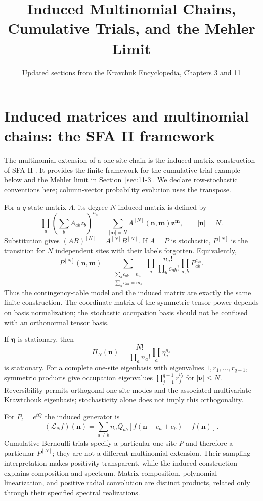 \documentclass[11pt,reqno]{amsart}
\title{Induced Multinomial Chains, Cumulative Trials, and the Mehler Limit}
\date{Updated sections from the Kravchuk Encyclopedia, Chapters 3 and 11}
\begin{document}
\maketitle
\section{Induced matrices and multinomial chains: the SFA II framework}
\label{sec:ency-sfa-ii}
The multinomial extension of a one-site chain is the induced-matrix
construction of SFA II \cite{FeinsilverSFAII2023}. It provides the finite
framework for the cumulative-trial example below and the Mehler limit
in Section~\ref{sec:11-3}. We declare row-stochastic conventions here;
column-vector probability evolution uses the transpose.

For a $q$-state matrix $A$, its degree-$N$ induced matrix is defined by
\begin{equation}\label{eq:ency-induced-definition}
\prod_a\left(\sum_bA_{ab}z_b\right)^{n_a}
=\sum_{|\mathbf m|=N}A^{[N]}(\mathbf n,\mathbf m)\mathbf z^{\mathbf m},
\qquad |\mathbf n|=N.
\end{equation}
Substitution gives $(AB)^{[N]}=A^{[N]}B^{[N]}$. If $A=P$ is stochastic,
$P^{[N]}$ is the transition for $N$ independent sites with their labels
forgotten. Equivalently,
\[
P^{[N]}(\mathbf n,\mathbf m)
=\sum_{\substack{\sum_b c_{ab}=n_a\\\sum_a c_{ab}=m_b}}
\prod_a\frac{n_a!}{\prod_b c_{ab}!}\prod_{a,b}P_{ab}^{c_{ab}}.
\]
Thus the contingency-table model and the induced matrix are exactly
the same finite construction. The coordinate matrix of the symmetric
tensor power depends on basis normalization; the stochastic occupation
basis should not be confused with an orthonormal tensor basis.

If $\boldsymbol\eta$ is stationary, then
\[
\Pi_N(\mathbf n)=\frac{N!}{\prod_a n_a!}\prod_a\eta_a^{n_a}
\]
is stationary. For a complete one-site eigenbasis with eigenvalues
$1,r_1,\ldots,r_{q-1}$, symmetric products give occupation eigenvalues
$\prod_{j=1}^{q-1}r_j^{\nu_j}$ for $|\boldsymbol\nu|\le N$.
Reversibility permits orthogonal one-site modes and the associated
multivariate Krawtchouk eigenbasis; stochasticity alone does not imply
this orthogonality.

For $P_t=e^{tQ}$ the induced generator is
\[
(\mathcal L_Nf)(\mathbf n)=\sum_{a\ne b}n_aQ_{ab}
[f(\mathbf n-e_a+e_b)-f(\mathbf n)].
\]
Cumulative Bernoulli trials specify a particular one-site $P$ and
therefore a particular $P^{[N]}$; they are not a different multinomial
extension. Their sampling interpretation makes positivity transparent,
while the induced construction explains composition and spectrum.
Matrix composition, polynomial linearization, and positive radial
convolution are distinct products, related only through their specified
spectral realizations.
\end{document}
